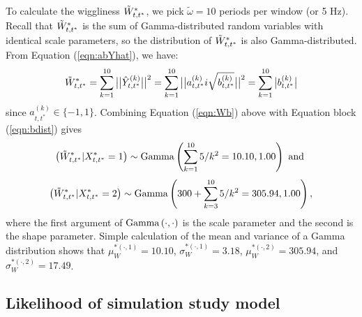 To calculate the wiggliness $\tilde{W}^*_{t,t^*}$, we pick $\tilde{\omega} = 10$ periods per window (or 5 Hz). Recall that $\tilde{W}^*_{t,t^*}$ is the sum of Gamma-distributed random variables with identical scale parameters, so the distribution of $\tilde{W}^*_{t,t^*}$ is also Gamma-distributed. From Equation (\ref{eqn:abYhat}), we have:
%
\begin{equation}
    \Ztwo_{t,t^*} = \sum_{k=1}^{10} \big|\big|\hat{Y}^{(k)}_{t,t^*}\big|\big|^2 = \sum_{k=1}^{10} \big|\big|a^{(k)}_{t,t^*}i\sqrt{b^{(k)}_{t,t^*}}\big|\big|^2 = \sum_{k=1}^{10} \big|b^{(k)}_{t,t^*}\big|
    \label{eqn:Wb}
\end{equation}
%
since $a^{(k)}_{t,t^*} \in \{-1,1\}$. Combining Equation (\ref{eqn:Wb}) above with Equation block (\ref{eqn:bdist}) gives
%
$$\left(\tilde{W}^*_{t,t^*}|X^*_{t,t^*} = 1\right) \sim {\rm{Gamma}}\left(\sum_{k=1}^{10} 5/k^2 = 10.10, 1.00 \right) \text { and }$$
%
$$\left(\tilde{W}^*_{t,t^*}|X^*_{t,t^*} = 2\right) \sim {\rm{Gamma}}\left(300 + \sum_{k=3}^{10} 5/k^2 = 305.94 , 1.00 \right),$$
%
where the first argument of ${\rm{Gamma}}\left(\cdot,\cdot\right)$ is the scale parameter and the second is the shape parameter. Simple calculation of the mean and variance of a Gamma distribution shows that $\mu_W^{*(\cdot,1)} = 10.10$, $\sigma_W^{*(\cdot,1)} = 3.18$, $\mu_W^{*(\cdot,2)} = 305.94$, and $\sigma_W^{*(\cdot,2)} = 17.49$.


\subsection{Likelihood of simulation study model}

